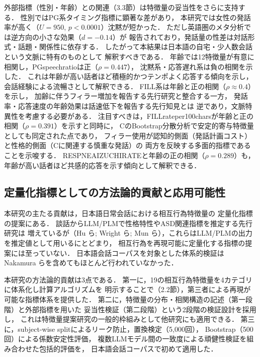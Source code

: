 \documentclass[dvipdfmx,11pt,a4paper]{bxjsarticle}
\renewcommand{\_}{\paperorigunderscore\allowbreak}%
\begin{document}
外部指標（性別・年齢）との関連（3.3節）は特徴量の妥当性をさらに支持する．
性別ではPG系タイミング指標に顕著な差があり，
本研究では女性の発話率が高く（$U = 950$, $p < 0.0001$）沈黙が短かった．
ただし英語圏のメタ分析\cite{leaper2007}では逆方向の小さな効果（$d = -0.14$）が
報告されており，発話量の性差は対話形式・話題・関係性に依存する\cite{bortfeld2001}．
したがって本結果は日本語の自宅・少人数会話という文脈に特有のものとして
解釈すべきである．
年齢では12特徴量が有意に相関し，PG\_speech\_ratioは正（$\rho = 0.447$），
沈黙系・応答遅れ系は負の相関を示した．
これは年齢が高い話者ほど積極的かつテンポよく応答する傾向を示し，
会話経験による流暢さとして解釈できる．
FILL系は年齢と正の相関（$\rho \approx 0.4$）を示し，
加齢に伴うフィラー増加を報告する先行研究\cite{bortfeld2001,horton2010}と整合する一方，
発話率・応答速度の年齢効果は話速低下を報告する先行知見\cite{horton2010}とは
逆であり，文脈特異性を考慮する必要がある．
注目すべきは，FILL\_rate\_per\_100charsが年齢と正の相関（$\rho = 0.391$）を示すと同時に，
CのBootstrap分散分析で安定的寄与特徴量としても同定された点であり，
フィラー使用が認知的側面（発話計画コスト）と性格的側面（Cに関連する慎重な発話）の
両方を反映する多面的指標であることを示唆する．
RESP\_NE\_AIZUCHI\_RATEと年齢の正の相関（$\rho = 0.289$）も，
年齢が高い話者ほど共感的応答を示す傾向として解釈できる．

\subsection{定量化指標としての方法論的貢献と応用可能性}

本研究の主たる貢献は，日本語日常会話における相互行為特徴量の
定量化指標の提案にある．
談話からLLM/PLMで性格特性やASD関連指標を推定する先行研究は
増えているが（Hu ら\cite{hu2025}; Wright ら\cite{wright2026};
Mun ら\cite{mun2024}），これらはLLM/PLMの出力を推定値として用いるにとどまり，
相互行為を再現可能に定量化する指標の提案には至っていない．
日本語会話コーパスを対象とした体系的検証は
Nakamura ら\cite{nakamura2025}を含めてもほとんど行われていなかった．

本研究の方法論的貢献は3点である．
第一に，19の相互行為特徴量を4カテゴリに体系化し計算アルゴリズムを
明示することで（2.2節），第三者による再現が可能な指標体系を提供した．
第二に，特徴量の分布・相関構造の記述（第一段階）と外部指標を用いた
妥当性検証（第二段階）という2段階の検証設計を採用し，
これは特徴量提案研究の一般的枠組みとして他研究にも適用できる．
第三に，subject-wise splitによるリーク防止，置換検定（5,000回），
Bootstrap（500回）による係数安定性評価，
複数LLMモデル間の一致度による頑健性検証を組み合わせた包括的評価を，
日本語会話コーパスで初めて適用した．
\end{document}

